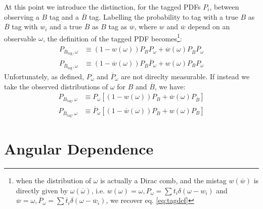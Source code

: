 \documentclass[a4paper,10pt,twosided]{article}
\begin{document}
\vfill
\pagebreak
At this point we introduce the distinction, for the tagged PDFs $P_i$, between observing a $B$ tag and a $\overline{B}$ tag.
Labelling the probability to tag with a true $B$ as $\overline{B}$ tag with $w_i$ and a true $\overline{B}$ as $B$ tag as $\overline{w}$,
where $w$ and $\overline{w}$ depend on an observable $\omega$,
the definition of the tagged PDF becomes\footnote{
when the distribution of $\omega$ is actually a Dirac comb, and the mistag $w(\overline{w})$ is directly given by $\omega(\overline{\omega})$, i.e. $ w(\omega) = \omega, P_\omega = \sum t_i \delta(\omega-w_i)$ 
and $\overline{w} = \omega, \overline{P}_\omega = \sum \overline{t}_i \delta(\omega-\overline{w}_i) $, we recover
eq. \ref{eq:tagdef}}:
\begin{eqnarray}
   P_{B_\mathrm{tag},\omega} &\equiv  (1-w(\omega)) P_{B} P_\omega  + \overline{w}(\omega) P_{\overline{ B} }\overline{P}_\omega \\
   P_{\overline{B}_\mathrm{tag},\omega} &\equiv (1-\overline{w}(\omega)) P_{\overline{B}}\overline{P}_\omega  +  w(\omega) P_{ B } P_\omega
\end{eqnarray} 
Unfortunately, as defined, $P_\omega$ and $\overline{P}_\omega$ are not direclty measurable.
If instead we take the observed distributions of $\omega$ for $B$  and $\overline{B}$, we have:
\begin{eqnarray}
   P_{B_\mathrm{tag},\omega} &\equiv P_\omega \left[ (1-w(\omega)) P_{B} + \overline{w}(\omega) P_{\overline{ B} } \right]\\
   P_{\overline{B}_\mathrm{tag},\omega} &\equiv \overline{P}_\omega\left[ (1-\overline{w}(\omega)) P_{\overline{B}} +  w(\omega) P_{ B } \right]
\end{eqnarray} 

\section{Angular Dependence}
\end{document}
